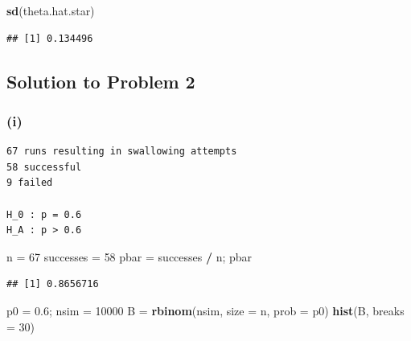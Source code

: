 \documentclass[]{article}
\newenvironment{Shaded}{\begin{snugshade}}{\end{snugshade}}
\newcommand{\DataTypeTok}[1]{\textcolor[rgb]{0.13,0.29,0.53}{#1}}
\newcommand{\DecValTok}[1]{\textcolor[rgb]{0.00,0.00,0.81}{#1}}
\newcommand{\FloatTok}[1]{\textcolor[rgb]{0.00,0.00,0.81}{#1}}
\newcommand{\KeywordTok}[1]{\textcolor[rgb]{0.13,0.29,0.53}{\textbf{#1}}}
\newcommand{\NormalTok}[1]{#1}
\newcommand{\OperatorTok}[1]{\textcolor[rgb]{0.81,0.36,0.00}{\textbf{#1}}}
\newcommand{\StringTok}[1]{\textcolor[rgb]{0.31,0.60,0.02}{#1}}
\begin{document}
\begin{Shaded}
\begin{Highlighting}[]
\KeywordTok{sd}\NormalTok{(theta.hat.star)}
\end{Highlighting}
\end{Shaded}

\begin{verbatim}
## [1] 0.134496
\end{verbatim}

\hypertarget{solution-to-problem-2}{%
\subsection{Solution to Problem 2}\label{solution-to-problem-2}}

\hypertarget{i-1}{%
\subsubsection{(i)}\label{i-1}}

\begin{verbatim}
67 runs resulting in swallowing attempts
58 successful
9 failed

H_0 : p = 0.6
H_A : p > 0.6

\end{verbatim}

\begin{Shaded}
\begin{Highlighting}[]
\NormalTok{n =}\StringTok{ }\DecValTok{67}
\NormalTok{successes =}\StringTok{ }\DecValTok{58}
\NormalTok{pbar =}\StringTok{ }\NormalTok{successes }\OperatorTok{/}\StringTok{ }\NormalTok{n; pbar}
\end{Highlighting}
\end{Shaded}

\begin{verbatim}
## [1] 0.8656716
\end{verbatim}

\begin{Shaded}
\begin{Highlighting}[]
\NormalTok{p0 =}\StringTok{ }\FloatTok{0.6}\NormalTok{; nsim =}\StringTok{ }\DecValTok{10000}
\NormalTok{B =}\StringTok{ }\KeywordTok{rbinom}\NormalTok{(nsim, }\DataTypeTok{size =}\NormalTok{ n, }\DataTypeTok{prob =}\NormalTok{ p0)}
\KeywordTok{hist}\NormalTok{(B, }\DataTypeTok{breaks =} \DecValTok{30}\NormalTok{)}
\end{Highlighting}
\end{Shaded}
\end{document}
